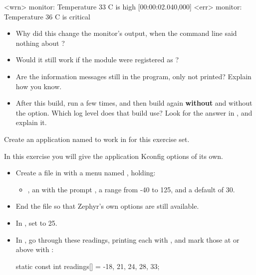 \begin{console}
[00:00:01.530,000] <wrn> monitor: Temperature 33 C is high
[00:00:02.040,000] <err> monitor: Temperature 36 C is critical
\end{console}

\begin{itemize}
  \item Why did this change the monitor’s output, when the command line said nothing about ?
  \item Would it still work if the module were registered as ?
  \item Are the information messages still in the program, only not printed? Explain how you know.
  \item After this build, run  a few times, and then build again \textbf{without}
     and without the  option. Which log level does that build use? Look for the answer
    in , and explain it.
\end{itemize}

\label{c1:set:3}
Create an application named  to work in for this exercise set.

\label{c1:ex:3.1}
In this exercise you will give the application Kconfig options of its own.

\begin{itemize}
  \item Create a  file in  with a menu named , holding:
\begin{itemize}
  \item {}, an  with the prompt , a range from -40 to 125, and a default of 30.
\end{itemize}
  \item End the file so that Zephyr’s own options are still available.
  \item In , set  to 25.
  \item In , go through these readings, printing each with , and mark those
    at or above  with :
\begin{ccode}
static const int readings[] = {-18, 21, 24, 28, 33};
\end{ccode}
\end{itemize}

